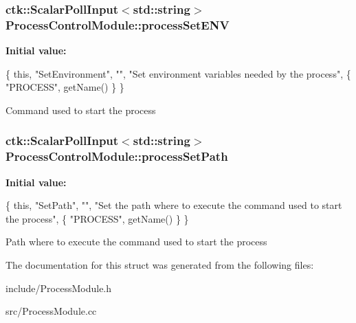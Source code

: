 \subsubsection[{\texorpdfstring{process\+Set\+E\+NV}{processSetENV}}]{\setlength{\rightskip}{0pt plus 5cm}ctk\+::\+Scalar\+Poll\+Input$<$std\+::string$>$ Process\+Control\+Module\+::process\+Set\+E\+NV}\hypertarget{structProcessControlModule_a95ed5208eb6265f71be5c96fa9b1bfd6}{}\label{structProcessControlModule_a95ed5208eb6265f71be5c96fa9b1bfd6}
{\bfseries Initial value\+:}
\begin{DoxyCode}
\{ \textcolor{keyword}{this}, \textcolor{stringliteral}{"SetEnvironment"}, \textcolor{stringliteral}{""}, \textcolor{stringliteral}{"Set environment variables needed by the process"},
    \{ \textcolor{stringliteral}{"PROCESS"}, getName() \} \}
\end{DoxyCode}
Command used to start the process 
\subsubsection[{\texorpdfstring{process\+Set\+Path}{processSetPath}}]{\setlength{\rightskip}{0pt plus 5cm}ctk\+::\+Scalar\+Poll\+Input$<$std\+::string$>$ Process\+Control\+Module\+::process\+Set\+Path}\hypertarget{structProcessControlModule_a2f3edf4b64217d9242034e876b74271e}{}\label{structProcessControlModule_a2f3edf4b64217d9242034e876b74271e}
{\bfseries Initial value\+:}
\begin{DoxyCode}
\{ \textcolor{keyword}{this}, \textcolor{stringliteral}{"SetPath"}, \textcolor{stringliteral}{""},
      \textcolor{stringliteral}{"Set the path where to execute the command used to start the process"},
    \{ \textcolor{stringliteral}{"PROCESS"}, getName() \} \}
\end{DoxyCode}
Path where to execute the command used to start the process 

The documentation for this struct was generated from the following files\+:\begin{DoxyCompactItemize}
\item 
include/Process\+Module.\+h\item 
src/Process\+Module.\+cc\end{DoxyCompactItemize}
